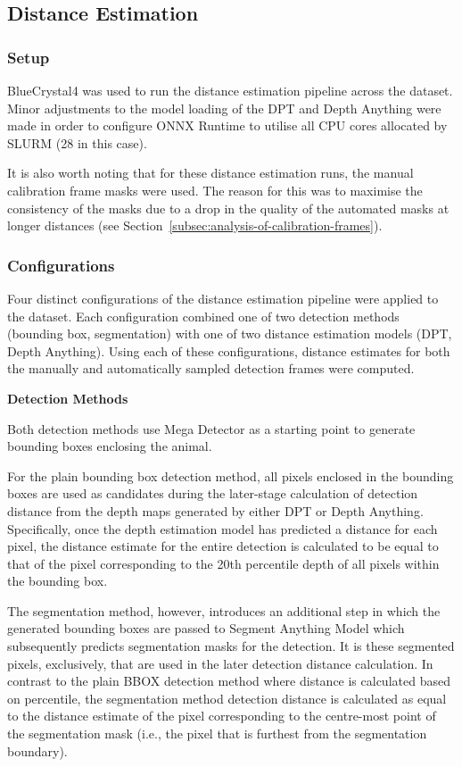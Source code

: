 \subsection{Distance Estimation}

\subsubsection{Setup}

BlueCrystal4 was used to run the distance estimation pipeline across the dataset.
Minor adjustments to the model loading of the DPT and Depth Anything
were made in order to configure ONNX Runtime to utilise all CPU cores allocated by
SLURM (28 in this case).

It is also worth noting that for these distance estimation runs, the manual calibration
frame masks were used.
The reason for this was to maximise the consistency of the masks due to a drop in the
quality of the automated masks at longer distances
(see Section~\ref{subsec:analysis-of-calibration-frames}).

\subsubsection{Configurations}\label{subsubsec:configuratons}

Four distinct configurations of the distance estimation pipeline were applied to the
dataset.
Each configuration combined one of two detection methods (bounding box, segmentation) with one
of two distance estimation models (DPT, Depth Anything).
Using each of these configurations, distance estimates for both the manually and automatically
sampled detection frames were computed.

\vspace{5mm}
\textbf{Detection Methods}

Both detection methods use Mega Detector as a starting point to generate bounding boxes
enclosing the animal.

For the plain bounding box detection method, all pixels enclosed in the bounding boxes are used
as candidates during the later-stage calculation of detection distance from the depth maps
generated by either DPT or Depth Anything.
Specifically, once the depth estimation model has predicted a distance for each pixel, the
distance estimate for the entire detection is calculated to be equal to that of the pixel
corresponding to the 20th percentile depth of all pixels within the bounding box.

The segmentation method, however, introduces an additional step in which the generated bounding
boxes are passed to Segment Anything Model which subsequently predicts segmentation masks for
the detection.
It is these segmented pixels, exclusively, that are used in the later detection distance calculation.
In contrast to the plain BBOX detection method where distance is calculated based on
percentile, the segmentation method detection distance is calculated as equal to the distance
estimate of the pixel corresponding to the centre-most point of the segmentation mask (i.e., the pixel
that is furthest from the segmentation boundary).

